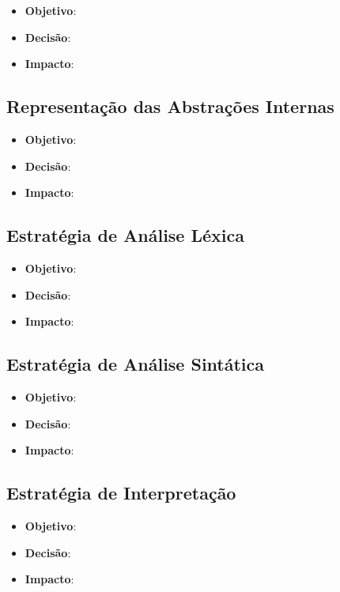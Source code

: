\begin{itemize}
	\item \textbf{Objetivo}:
	\item \textbf{Decisão}:
	\item \textbf{Impacto}:
\end{itemize}

\subsection{Representação das Abstrações Internas}

\begin{itemize}
	\item \textbf{Objetivo}:
	\item \textbf{Decisão}:
	\item \textbf{Impacto}:
\end{itemize}

\subsection{Estratégia de Análise Léxica}

\begin{itemize}
	\item \textbf{Objetivo}:
	\item \textbf{Decisão}:
	\item \textbf{Impacto}:
\end{itemize}

\subsection{Estratégia de Análise Sintática}

\begin{itemize}
	\item \textbf{Objetivo}:
	\item \textbf{Decisão}:
	\item \textbf{Impacto}:
\end{itemize}

\subsection{Estratégia de Interpretação}

\begin{itemize}
	\item \textbf{Objetivo}:
	\item \textbf{Decisão}:
	\item \textbf{Impacto}:
\end{itemize}

